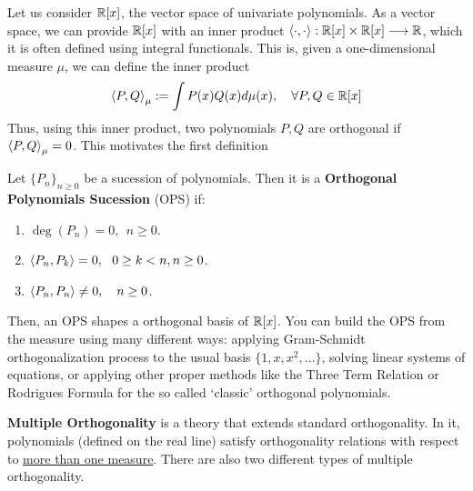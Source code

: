 \documentclass[portrait,final,a0paper,fontscale=0.38]{baposter}
\begin{document}
\begin{poster}
{\begin{multicols}{2}
  Let us consider $\mathbb{R}[x]$, the vector space of univariate polynomials. As a vector space, we can provide $\mathbb{R}[x]$ with an inner product $\left\langle \cdot , \cdot \right\rangle:\mathbb{R}[x]\times\mathbb{R}[x]\longrightarrow\mathbb{R}$, which it is often defined using integral functionals. This is, given a one-dimensional measure $\mu$, we can define the inner product
  \begin{equation}
    \label{eq:prodesc}
    \left\langle P , Q \right\rangle_\mu:=\int P(x)Q(x)d\mu(x), \ \ \ \forall P,Q\in\mathbb{R}[x]
  \end{equation}
  Thus, using this inner product, two polynomials $P,Q$ are orthogonal if $\left\langle P , Q \right\rangle_\mu = 0$. This motivates the first definition
  \begin{definition}
    Let $\{P_n\}_{n\geq 0}$ be a sucession of polynomials. Then it is a \textbf{Orthogonal Polynomials Sucession} (OPS) if:
    \begin{enumerate}
      \item $\deg(P_n)=0, \ \ n\geq 0$.
      \item $\left\langle P_n , P_k \right\rangle=0, \ \ 0\geq k < n, n\geq 0$.
      \item $\prodesc{P_n}{P_n} \not = 0, \ \ \ n\geq 0$.
    \end{enumerate}
  \end{definition}
  Then, an OPS shapes a orthogonal basis of $\mathbb{R}[x]$. You can build the OPS from the measure using many different ways: applying Gram-Schmidt orthogonalization process to the usual basis $\{1,x,x^2,\dots\}$, solving linear systems of equations, or applying other proper methods like the Three Term Relation or Rodrigues Formula for the so called `classic' orthogonal polynomials. 


\end{multicols}
	}


  {

\begin{multicols}{2}

  \textbf{Multiple Orthogonality} is a theory that extends standard orthogonality. In it, polynomials (defined on the real line) satisfy orthogonality relations with respect to \underline{more than one measure}. There are also two different types of multiple orthogonality.


\end{multicols}}
\end{poster}
\end{document}
